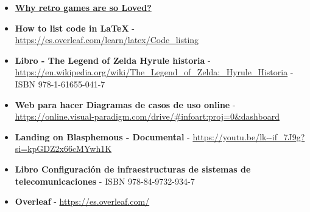 \documentclass[a4paper]{article}
\begin{document}
\begin{itemize}
    \item \textbf{\href{https://www.wired.com/story/why-retro-looking-games-get-so-much-love/}{Why retro games are so Loved?}}
    \item \textbf{How to list code in LaTeX} - \url{https://es.overleaf.com/learn/latex/Code_listing}
    \item \textbf{Libro - The Legend of Zelda Hyrule historia} - \url{https://en.wikipedia.org/wiki/The_Legend_of_Zelda:_Hyrule_Historia} - ISBN 978-1-61655-041-7
    \item \textbf{Web para hacer Diagramas de casos de uso online} - \url{https://online.visual-paradigm.com/drive/#infoart:proj=0&dashboard}
    \item \textbf{Landing on Blasphemous - Documental} - \url{https://youtu.be/lk--if_7J9g?si=kpGDZ2x66cMYwh1K}
    \item \textbf{Libro Configuración de infraestructuras de sistemas de telecomunicaciones} - ISBN 978-84-9732-934-7
    \item \textbf{Overleaf} - \url{https://es.overleaf.com/}
\end{itemize}

\clearpage
\end{document}
